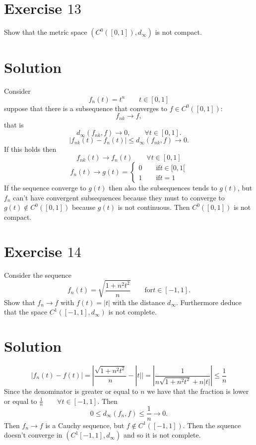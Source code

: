 \documentclass[a4paper, twoside, openany]{book}
\begin{document}
\section*{Exercise $13$}
Show that the metric space $(C^0([0, 1]), d_{\infty})$ is not compact.
\section*{Solution}
Consider
$$f_n(t) = t^n \qquad t \in [0, 1]$$
suppose that there is a subsequence that converges to $f \in C^0([0,1])$:
$$f_{nk} \rightarrow f,$$
that is
$$d_{\infty}(f_{nk}, f) \rightarrow 0, \qquad \forall t \in [0, 1].$$
$$|f_{nk}(t) - f_n(t)| \leq d_{\infty}(f_{nk}, f) \rightarrow 0.$$
If this holds then
$$f_{nk}(t) \rightarrow f_n(t) \qquad \forall t \in [0, 1]$$
$$f_n(t) \rightarrow g(t) = \begin{cases}
								0 \qquad \textrm{if} t \in [0, 1[ \\
								1 \qquad \textrm{if} t = 1
						    \end{cases}$$
If the sequence converge to $g(t)$ then also the subsequences tends to $g(t)$, but $f_n$ can't have convergent subsequences because they must to converge to $g(t) \notin C^0([0, 1])$ because $g(t)$ is not continuous. Then $C^0([0, 1])$ is not compact.
\clearpage
\section*{Exercise $14$}
Consider the sequence
$$f_n(t) = \sqrt{\frac{1 + n^2 t^2}{n}} \qquad \textrm{for} t \in [-1, 1].$$
Show that $f_n \rightarrow f$ with $f(t) = |t|$ with the distance $d_{\infty}$. Furthermore deduce that the space $C^1([-1, 1], d_{\infty})$ is not complete.
\section*{Solution}
$$|f_n(t) - f(t)| = |\frac{\sqrt{1 + n^2 t^2}}{n} - |t| | = | \frac{1}{n \sqrt{1 + n^2 t^2} + n|t|}| \leq \frac{1}{n}$$
Since the denominator is greater or equal to $n$ we have that the fraction is lower or equal to $\frac{1}{n} \qquad \forall t \in [-1, 1]$. Then
$$0 \leq d_{\infty}(f_n, f) \leq \frac{1}{n} \rightarrow 0.$$
Then $f_n \rightarrow f$ is a Cauchy sequence, but $f \notin C^1([-1, 1])$. Then the squence doesn't converge in $(C^1[-1, 1], d_{\infty})$ and so it is not complete.
\clearpage
\end{document}
